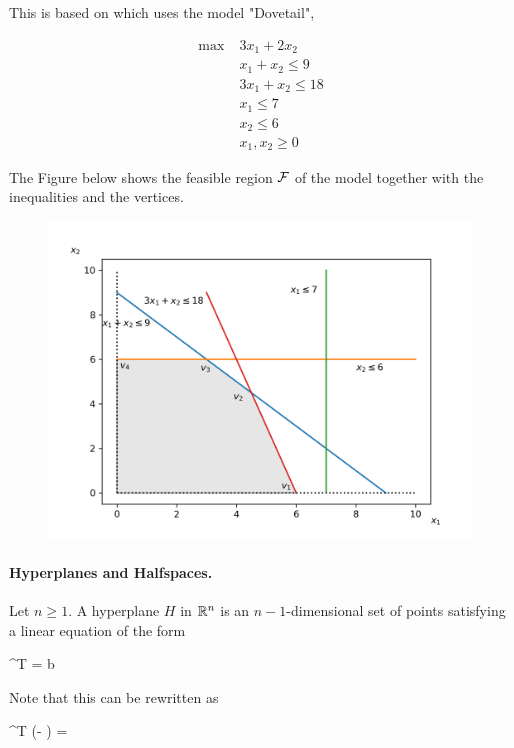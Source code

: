 
This is based on \cite{Sierksma2015} which uses the model "Dovetail",

\begin{align*}
  \max \; & 3x_1 + 2x_2 \\
       & x_1 + x_2 \leq 9 \\
       & 3x_1 + x_2 \leq 18 \\
       & x_1 \leq 7 \\
       & x_2 \leq 6 \\
       & x_1, x_2 \geq 0
\end{align*}

The Figure below shows the feasible region $\mathcal{F}$ of the model together with the inequalities and the vertices.

\begin{figure}[H]
\includegraphics[scale = 0.7]{images/2022-09-27_lin_prog_1_01.png}
\end{figure}

\paragraph{Hyperplanes and Halfspaces.} Let $n \geq 1$. A hyperplane $H$ in $\mathbb{R}^n$ is an $n-1$-dimensional set of points satisfying a linear equation of the form

\bee
\abf^T \xbf = b
\eee

Note that this can be rewritten as

\bee
\abf^T (\xbf - \dbf) = \zerobf
\eee

